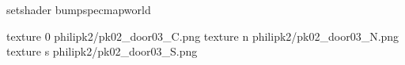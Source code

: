 setshader bumpspecmapworld

texture 0 philipk2/pk02_door03_C.png
texture n philipk2/pk02_door03_N.png
texture s philipk2/pk02_door03_S.png

